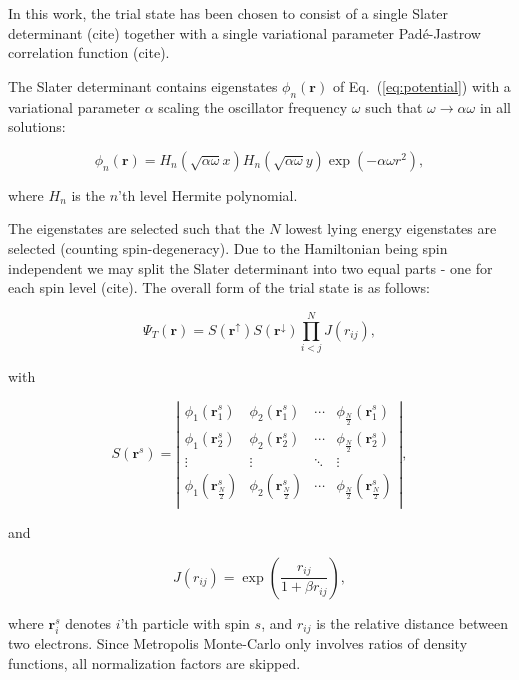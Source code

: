 \documentclass[amsmath, amssymb, aps, floatfix, nofootinbib, preprintnumbers,showpacs, superscriptaddress, twocolumn]{revtex4-1}
\begin{document}
In this work, the trial state has been chosen to consist of a single Slater determinant (cite)
together with a single variational parameter Padé-Jastrow correlation function (cite).

The Slater determinant contains eigenstates $\phi_n(\mathbf{r})$ of Eq.~(\ref{eq:potential})
with a variational parameter $\alpha$ scaling the oscillator frequency $\omega$
such that $\omega\to\alpha\omega$ in all solutions:

\begin{equation}
 \phi_n(\mathbf{r}) = H_n(\sqrt{\alpha\omega}x)H_n(\sqrt{\alpha\omega}y)\exp(-\alpha\omega r^2),
\end{equation}

\noindent
where $H_n$ is the $n$'th level Hermite polynomial.


The eigenstates are selected such that the $N$ lowest lying energy eigenstates are selected (counting spin-degeneracy). Due to the Hamiltonian being spin independent we may split the Slater determinant into two equal parts -
one for each spin level (cite). The overall form of the trial state is as follows:

\begin{equation}
 \Psi_T(\mathbf{r}) = S(\mathbf{r}^\uparrow) S(\mathbf{r}^\downarrow) \prod_{i<j}^{N} J(r_{ij}),
\end{equation}

with

\begin{equation}
 S(\mathbf{r}^s) =  \left| \begin{array}{cccc}
\phi_1(\mathbf{r}^s_1) & \phi_2(\mathbf{r}^s_1)& \cdots & \phi_\frac{N}{2}(\mathbf{r}^s_1) \\
\phi_1(\mathbf{r}^s_2) & \phi_2(\mathbf{r}^s_2)& \cdots & \phi_\frac{N}{2}(\mathbf{r}^s_2) \\
\vdots & \vdots& \ddots & \vdots \\
\phi_1(\mathbf{r}^s_\frac{N}{2}) & \phi_2(\mathbf{r}^s_\frac{N}{2})& \cdots & \phi_\frac{N}{2}(\mathbf{r}^s_\frac{N}{2}) \\
 \end{array} \right|,
\end{equation}

and

\begin{equation}
 J(r_{ij}) = \exp\left(\frac{r_{ij}}{1 + \beta r_{ij}}\right),
\end{equation}

where $\mathbf{r}^s_i$ denotes $i$'th particle with spin $s$, and $r_{ij}$ is the relative distance between two electrons.
Since Metropolis Monte-Carlo only involves ratios of density functions, all normalization factors are skipped.
\end{document}
